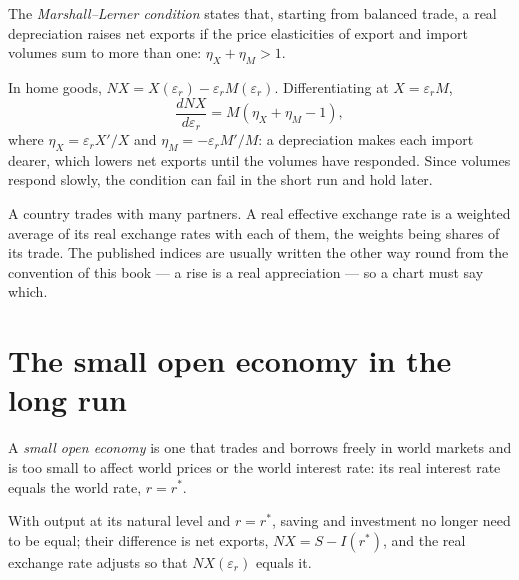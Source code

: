 \begin{definition}\label{def:b1:open-economy:marshall-lerner}
The \emph{Marshall--Lerner condition} states that, starting from balanced
trade, a real depreciation raises net exports if the price elasticities of
export and import volumes sum to more than one: $\eta_X + \eta_M > 1$.
\end{definition}

In home goods, $NX = X(\varepsilon_r) - \varepsilon_r M(\varepsilon_r)$. Differentiating at $X = \varepsilon_r M$,
\[
\frac{dNX}{d\varepsilon_r} = M(\eta_X + \eta_M - 1),
\]
where $\eta_X = \varepsilon_r X'/X$ and $\eta_M = -\varepsilon_r M'/M$: a depreciation makes each import dearer,
which lowers net exports until the volumes have responded. Since volumes
respond slowly, the condition can fail in the short run and hold later.

\begin{measure}
A country trades with many partners. A real effective exchange rate is a
weighted average of its real exchange rates with each of them, the weights
being shares of its trade. The published indices are usually written the
other way round from the convention of this book --- a rise is a real
appreciation --- so a chart must say which.
\end{measure}

\section{The small open economy in the long run}\label{sec:b1:open-economy:long-run}

\begin{definition}\label{def:b1:open-economy:small-open}
A \emph{small open economy} is one that trades and borrows freely in world
markets and is too small to affect world prices or the world interest
rate: its real interest rate equals the world rate, $r = r^*$.
\end{definition}

With output at its natural level and $r = r^*$, saving and investment no longer
need to be equal; their difference is net exports, $NX = S - I(r^*)$, and the
real exchange rate adjusts so that $NX(\varepsilon_r)$ equals it.

